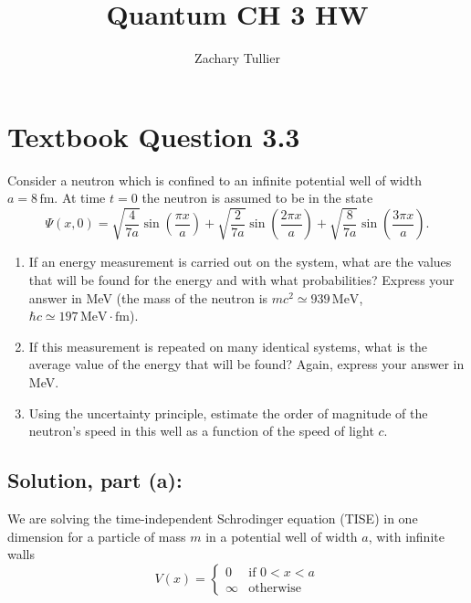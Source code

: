 \documentclass[12pt]{article}
\begin{document}
\singlespacing  %
\title{Quantum CH 3 HW}

\author[1]{Zachary Tullier}
\date{}
\maketitle

\section{Textbook Question 3.3}
    Consider a neutron which is confined to an infinite potential well of width \( a = 8\, \text{fm} \). At time \( t = 0 \) the neutron is assumed to be in the state
    \[
        \Psi(x, 0) = \sqrt{\frac{4}{7a}} \sin\left( \frac{\pi x}{a} \right) 
        + \sqrt{\frac{2}{7a}} \sin\left( \frac{2\pi x}{a} \right)
        + \sqrt{\frac{8}{7a}} \sin\left( \frac{3\pi x}{a} \right).
    \]

    \begin{enumerate}
      \item[(a)] If an energy measurement is carried out on the system, what are the values that will be found for the energy and with what probabilities? Express your answer in MeV (the mass of the neutron is \( mc^2 \simeq 939\, \text{MeV} \), \( \hbar c \simeq 197\, \text{MeV} \cdot \text{fm} \)).
    
      \item[(b)] If this measurement is repeated on many identical systems, what is the average value of the energy that will be found? Again, express your answer in MeV.
    
      \item[(c)] Using the uncertainty principle, estimate the order of magnitude of the neutron’s speed in this well as a function of the speed of light \( c \).
    \end{enumerate}
    


    \subsection{Solution, part (a):}
        We are solving the time-independent Schrodinger equation (TISE) in one dimension for a particle of mass $m$ in a potential well of width $a$, with infinite walls
        \[
            V(x) = 
            \begin{cases}
            0 & \text{if } 0 < x < a \\
            \infty & \text{otherwise}
            \end{cases}
        \]
\end{document}
